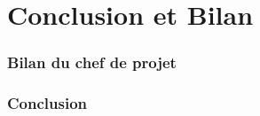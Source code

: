 \part{Conclusion et Bilan}
\setcounter{section}{0}

\section{Bilan du chef de projet}

\section{Conclusion}